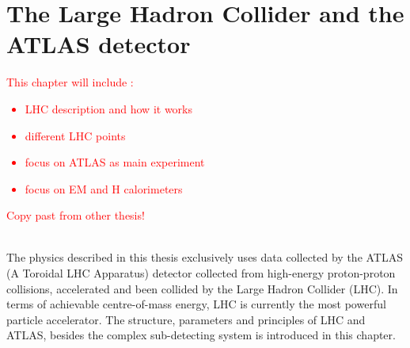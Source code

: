 \newpage
\chapter{The Large Hadron Collider and the ATLAS detector}
\label{LHC&ATLAS}
\textcolor{red}{ This chapter will include :
\begin{itemize}
    \item LHC description and how it works
    \item different LHC points 
    \item focus on ATLAS as main experiment
    \item focus on EM and H calorimeters 
\end{itemize}
Copy past from other thesis!
} \\
The physics described in this thesis exclusively uses data collected by the ATLAS (A Toroidal LHC Apparatus) detector collected from high-energy proton-proton collisions, accelerated and been collided by the Large Hadron Collider (LHC). In terms of achievable centre-of-mass energy, LHC is currently the most powerful particle accelerator. The structure, parameters and principles of LHC and ATLAS, besides the complex sub-detecting system is introduced in this chapter.

